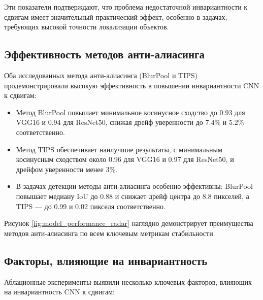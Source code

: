 Эти показатели подтверждают, что проблема недостаточной инвариантности к сдвигам имеет значительный практический эффект, особенно в задачах, требующих высокой точности локализации объектов.

\subsection{Эффективность методов анти-алиасинга}
\label{discussion:synthesis:effectiveness}

Оба исследованных метода анти-алиасинга (BlurPool и TIPS) продемонстрировали высокую эффективность в повышении инвариантности CNN к сдвигам:

\begin{itemize}
    \item Метод BlurPool повышает минимальное косинусное сходство до 0.93 для VGG16 и 0.94 для ResNet50, снижая дрейф уверенности до 7.4\% и 5.2\% соответственно.
    
    \item Метод TIPS обеспечивает наилучшие результаты, с минимальным косинусным сходством около 0.96 для VGG16 и 0.97 для ResNet50, и дрейфом уверенности менее 3\%.
    
    \item В задачах детекции методы анти-алиасинга особенно эффективны: BlurPool повышает медиану IoU до 0.88 и снижает дрейф центра до 8.8 пикселей, а TIPS — до 0.99 и 0.02 пикселя соответственно.
\end{itemize}

Рисунок \ref{fig:model_performance_radar} наглядно демонстрирует преимущества методов анти-алиасинга по всем ключевым метрикам стабильности.

\subsection{Факторы, влияющие на инвариантность}
\label{discussion:synthesis:factors}

Аблационные эксперименты выявили несколько ключевых факторов, влияющих на инвариантность CNN к сдвигам:

